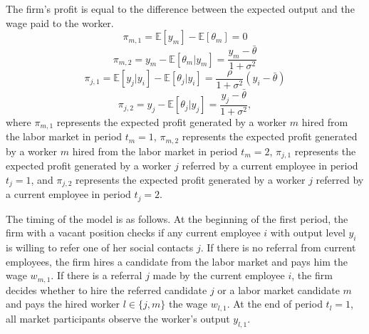 \documentclass[12pt]{article}
\begin{document}

The firm's profit is equal to the difference between the expected output and the wage paid to the worker.
\begin{equation}\label{eq_pi_m_1}
    \pi_{m,1} = \mathbb{E}[y_m]-\mathbb{E}[\theta_m] = 0
\end{equation}
\begin{equation}\label{eq_pi_m_2}
    \pi_{m,2} = y_m - \mathbb{E}[\theta_m|y_m] = \frac{y_m-\bar{\theta}}{1+\sigma^2}
\end{equation}
\begin{equation}\label{eq_pi_j_1}
    \pi_{j,1} = \mathbb{E}[y_j|y_i]-\mathbb{E}[\theta_j|y_i] = \frac{\rho}{1+\sigma^2}(y_i-\bar{\theta})
\end{equation}
\begin{equation}\label{eq_pi_j_2}
    \pi_{j,2} = y_j - \mathbb{E}[\theta_j|y_j] = \frac{y_j-\bar{\theta}}{1+\sigma^2},
\end{equation}
where $\pi_{m,1}$ represents the expected profit generated by a worker $m$ hired from the labor market in period $t_m = 1$, $\pi_{m,2}$ represents the expected profit generated by a worker $m$ hired from the labor market in period $t_m = 2$, $\pi_{j,1}$ represents the expected profit generated by a worker $j$ referred by a current employee in period $t_j = 1$, and $\pi_{j,2}$ represents the expected profit generated by a worker $j$ referred by a current employee in period $t_j = 2$.

The timing of the model is as follows. At the beginning of the first period, the firm with a vacant position checks if any current employee $i$ with output level $y_i$ is willing to refer one of her social contacts $j$. If there is no referral from current employees, the firm hires a candidate from the labor market and pays him the wage $w_{m,1}$. If there is a referral $j$ made by the current employee $i$, the firm decides whether to hire the referred candidate $j$ or a labor market candidate $m$ and pays the hired worker $l \in \lbrace j,m \rbrace$ the wage $w_{l,1}$. At the end of period $t_l = 1$, all market participants observe  the worker's output $y_{l,1}$. %
\end{document}
